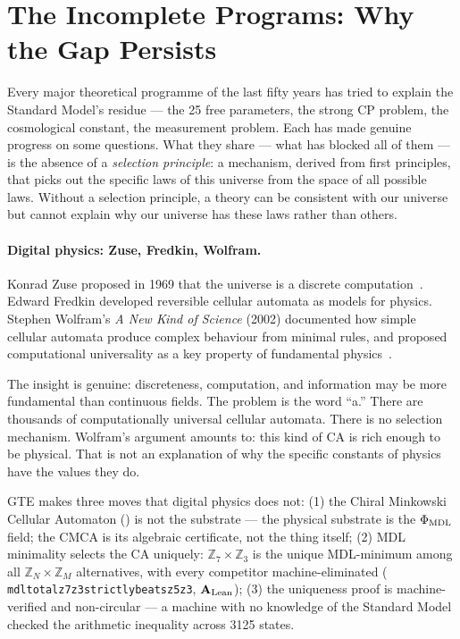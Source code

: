 \documentclass[11pt,openany]{book}
\theoremstyle{remark}
\newcommand{\lean}[1]{%
  \penalty-100
  \begingroup\def\_{\textunderscore\allowbreak}\texttt{#1}\endgroup}
\newcommand{\CMCA}{\text{CMCA}}
\newcommand{\CatAL}{\ensuremath{\textbf{A}_{\rm Lean}}}
\begin{document}
\section{The Incomplete Programs: Why the Gap Persists}
\label{sec:failed}

Every major theoretical programme of the last fifty years has tried to explain the
Standard Model's residue --- the 25 free parameters, the strong CP problem, the
cosmological constant, the measurement problem.
Each has made genuine progress on some questions.
What they share --- what has blocked all of them --- is the absence of a
\emph{selection principle}: a mechanism, derived from first principles, that picks
out the specific laws of this universe from the space of all possible laws.
Without a selection principle, a theory can be consistent with our universe but cannot
explain why our universe has these laws rather than others.

\paragraph{Digital physics: Zuse, Fredkin, Wolfram.}
Konrad Zuse proposed in 1969 that the universe is a discrete
computation~\cite{Zuse1969}.
Edward Fredkin developed reversible cellular automata as models for physics.
Stephen Wolfram's \textit{A New Kind of Science} (2002) documented how simple cellular
automata produce complex behaviour from minimal rules, and proposed computational
universality as a key property of fundamental physics~\cite{Wolfram2002}.

The insight is genuine: discreteness, computation, and information may be more
fundamental than continuous fields.
The problem is the word ``a.''
There are thousands of computationally universal cellular automata.
There is no selection mechanism.
Wolfram's argument amounts to: this kind of CA is rich enough to be physical.
That is not an explanation of why the specific constants of physics have the values
they do.

GTE makes three moves that digital physics does not:
(1) the Chiral Minkowski Cellular Automaton (\CMCA) is not the substrate --- the
physical substrate is the $\Phi_{\rm MDL}$ field; the CMCA is its algebraic
certificate, not the thing itself;
(2) MDL minimality selects the CA uniquely: $\mathbb{Z}_7\times\mathbb{Z}_3$ is the
unique MDL-minimum among all $\mathbb{Z}_N\times\mathbb{Z}_M$ alternatives, with every
competitor machine-eliminated (\lean{mdl\_total\_z7z3\_strictly\_beats\_z5z3}, \CatAL);
(3) the uniqueness proof is machine-verified and non-circular --- a machine with no
knowledge of the Standard Model checked the arithmetic inequality across 3125 states.
\end{document}
